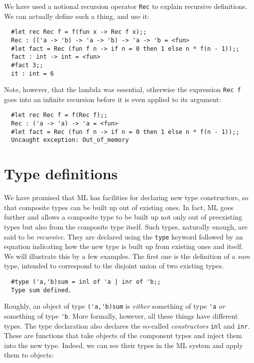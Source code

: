 We have used a notional recursion operator {\tt Rec} to explain recursive
definitions. We can actually define such a thing, and use it:

\begin{boxed}\begin{verbatim}
  #let rec Rec f = f(fun x -> Rec f x);;
  Rec : (('a -> 'b) -> 'a -> 'b) -> 'a -> 'b = <fun>
  #let fact = Rec (fun f n -> if n = 0 then 1 else n * f(n - 1));;
  fact : int -> int = <fun>
  #fact 3;;
  it : int = 6
\end{verbatim}\end{boxed}

Note, however, that the lambda was essential, otherwise the expression {\tt Rec
f} goes into an infinite recursion before it is even applied to its argument:

\begin{boxed}\begin{verbatim}
  #let rec Rec f = f(Rec f);;
  Rec : ('a -> 'a) -> 'a = <fun>
  #let fact = Rec (fun f n -> if n = 0 then 1 else n * f(n - 1));;
  Uncaught exception: Out_of_memory
\end{verbatim}\end{boxed}

\section{Type definitions}

We have promised that ML has facilities for declaring new type constructors, so
that composite types can be built up out of existing ones. In fact, ML goes
further and allows a composite type to be built up not only out of preexisting
types but also from the composite type itself. Such types, naturally enough,
are said to be {\em recursive}. They are declared using the {\tt type} keyword
followed by an equation indicating how the new type is built up from existing
ones and itself. We will illustrate this by a few examples. The first one is
the definition of a {\em sum} type, intended to correspond to the disjoint
union of two existing types.

\begin{boxed}\begin{verbatim}
  #type ('a,'b)sum = inl of 'a | inr of 'b;;
  Type sum defined.
\end{verbatim}\end{boxed}

Roughly, an object of type {\verb+('a,'b)sum+} is {\em either} something of
type {\verb+'a+} {\em or} something of type {\verb+'b+}. More formally,
however, all these things have different types. The type declaration also
declares the so-called {\em constructors} {\verb+inl+} and {\verb+inr+}. These
are functions that take objects of the component types and inject them into the
new type. Indeed, we can see their types in the ML system and apply them to
objects:

